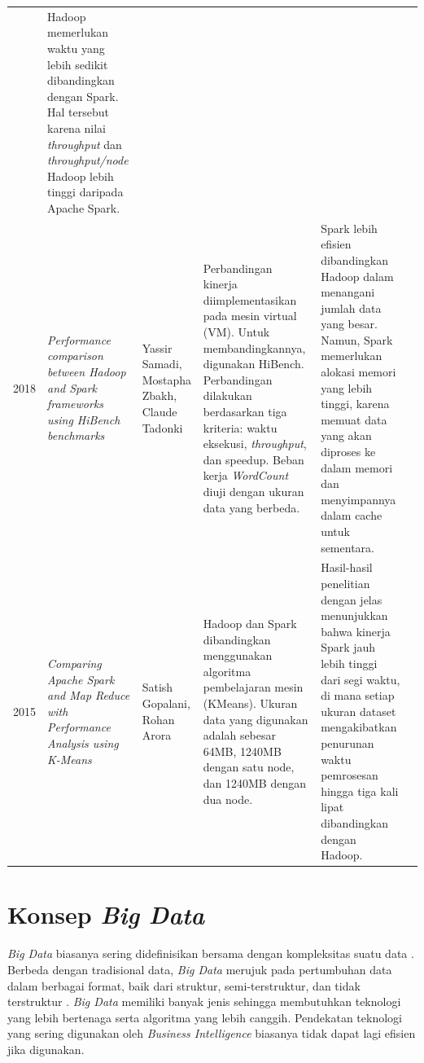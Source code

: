 \begin{table}
\begin{tabularx}{\textwidth}{c*{5}{>{\raggedright\arraybackslash}X}}
  & Hadoop memerlukan waktu yang lebih sedikit dibandingkan dengan Spark. Hal tersebut karena nilai \textit{throughput} dan \textit{throughput/node} Hadoop lebih tinggi daripada Apache Spark. \\
2018 & \textit{Performance comparison between Hadoop and Spark frameworks using HiBench benchmarks \cite{samadiPerformanceComparisonHadoop2018}} 
  & Yassir Samadi, Mostapha Zbakh, Claude Tadonki 
  & Perbandingan kinerja diimplementasikan pada mesin virtual (VM). Untuk membandingkannya, digunakan HiBench. Perbandingan dilakukan berdasarkan tiga kriteria: waktu eksekusi, \textit{throughput}, dan speedup. Beban kerja \textit{WordCount} diuji dengan ukuran data yang berbeda.
  & Spark lebih efisien dibandingkan Hadoop dalam menangani jumlah data yang besar. Namun, Spark memerlukan alokasi memori yang lebih tinggi, karena memuat data yang akan diproses ke dalam memori dan menyimpannya dalam cache untuk sementara. \\
 2015 & \textit{Comparing Apache Spark and Map Reduce with Performance Analysis using K-Means \cite{gopalaniComparingApacheSpark2015}} 
  & Satish Gopalani, Rohan Arora
  & Hadoop dan Spark dibandingkan menggunakan algoritma pembelajaran mesin (KMeans). Ukuran data yang digunakan adalah sebesar 64MB, 1240MB dengan satu node, dan 1240MB dengan dua node.  
  & Hasil-hasil penelitian dengan jelas menunjukkan bahwa kinerja Spark jauh lebih tinggi dari segi waktu, di mana setiap ukuran dataset mengakibatkan penurunan waktu pemrosesan hingga tiga kali lipat dibandingkan dengan Hadoop. \\
\bottomrule
\end{tabularx}
\end{table}



\newpage
\section{Konsep \textit{Big Data}}
\textit{Big Data} biasanya sering didefinisikan bersama dengan kompleksitas suatu data \cite{barosenAnalysisComparisonInterfacing2018}. Berbeda dengan tradisional data, \textit{Big Data} merujuk pada pertumbuhan data dalam berbagai format, baik dari struktur, semi-terstruktur, dan tidak terstruktur \cite{oussousBigDataTechnologies2018}. \textit{Big Data} memiliki banyak jenis sehingga membutuhkan teknologi yang lebih bertenaga serta algoritma yang lebih canggih. Pendekatan teknologi yang sering digunakan oleh \textit{Business Intelligence} biasanya tidak dapat lagi efisien jika digunakan.

